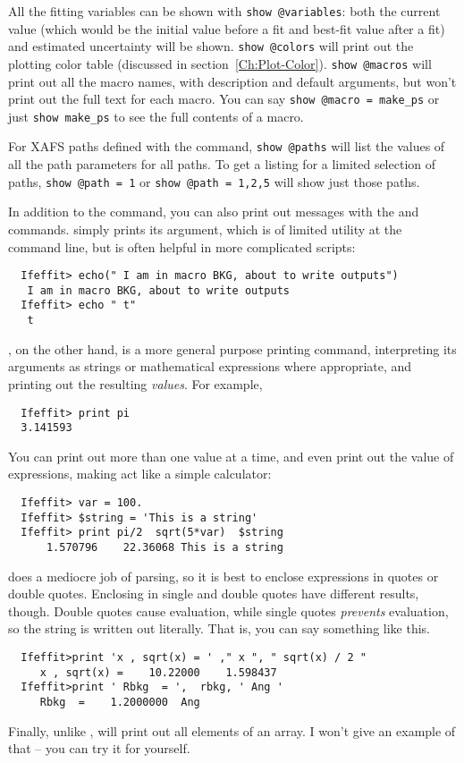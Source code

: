 All the fitting variables can be shown with {\tt{show @variables}}: both
the current value (which would be the initial value before a fit and
best-fit value after a fit) and estimated uncertainty will be shown.
{\tt{show @colors}} will print out the plotting color table (discussed in
section~\ref{Ch:Plot-Color}).  {\tt{show @macros}} will print out all the
macro names, with description and default arguments, but won't print out
the full text for each macro.  You can say {\tt{show @macro = make\_ps}} or
just {\tt{show make\_ps}} to see the full contents of a macro.

For XAFS paths defined with the {} command, {\tt{show @paths}}
will list the values of all the path parameters for all paths.  To get a
listing for a limited selection of paths, {\tt{show @path = 1}} or
{\tt{show @path = 1,2,5}} will show just those paths.

In addition to the {} command, you can also print out messages
with the {} and {} commands.  {} simply prints
its argument, which is of limited utility at the command line, but is often
helpful in more complicated scripts:
\begin{verbatim}
  Ifeffit> echo(" I am in macro BKG, about to write outputs")
   I am in macro BKG, about to write outputs
  Ifeffit> echo " t"
   t
\end{verbatim}
\noindent
{}, on the other hand, is a more general purpose printing
command, interpreting its arguments as strings or mathematical expressions
where appropriate, and printing out the resulting {\emph{values}}. For
example,  
\begin{verbatim}
  Ifeffit> print pi
  3.141593
\end{verbatim}
\noindent
You can print out more than one value at a time, and even print out the
value of expressions, making {} act like a  simple calculator:  
\begin{verbatim}
  Ifeffit> var = 100.
  Ifeffit> $string = 'This is a string'
  Ifeffit> print pi/2  sqrt(5*var)  $string
      1.570796    22.36068 This is a string
\end{verbatim}
\noindent  %
{} does a mediocre job of parsing, so it is best to enclose
expressions in quotes or double quotes. Enclosing in single and double
quotes have different results, though.  Double quotes cause evaluation,
while single quotes {\emph{prevents}} evaluation, so the string is written
out literally.  That is, you can say something like this.
\begin{verbatim}
  Ifeffit>print 'x , sqrt(x) = ' ," x ", " sqrt(x) / 2 "
     x , sqrt(x) =    10.22000    1.598437
  Ifeffit>print ' Rbkg  = ',  rbkg, ' Ang '
     Rbkg  =    1.2000000  Ang
\end{verbatim}
\noindent   
Finally, unlike {}, {} will print out all elements of an
array.  I won't give an example of that -- you can try it for yourself.


